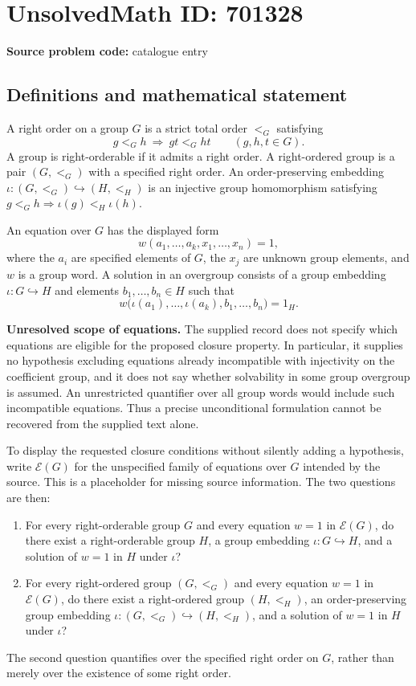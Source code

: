 \documentclass[11pt]{article}
\begin{document}
\section*{UnsolvedMath ID: 701328}
\textbf{Source problem code:} catalogue entry
\subsection{Definitions and mathematical statement}
A right order on a group \(G\) is a strict total order \(<_G\) satisfying
\[
 g<_G h\ \Longrightarrow\ gt<_G ht
 \qquad(g,h,t\in G).
\]
A group is right-orderable if it admits a right order. A right-ordered group is a pair \((G,<_G)\) with a specified right order. An order-preserving embedding \(\iota:(G,<_G)\hookrightarrow(H,<_H)\) is an injective group homomorphism satisfying \(g<_G h\Longrightarrow\iota(g)<_H\iota(h)\).

An equation over \(G\) has the displayed form
\[
 w(a_1,\ldots,a_k,x_1,\ldots,x_n)=1,
\]
where the \(a_i\) are specified elements of \(G\), the \(x_j\) are unknown group elements, and \(w\) is a group word. A solution in an overgroup consists of a group embedding \(\iota:G\hookrightarrow H\) and elements \(b_1,\ldots,b_n\in H\) such that
\[
 w\bigl(\iota(a_1),\ldots,\iota(a_k),b_1,\ldots,b_n\bigr)=1_H.
\]

\textbf{Unresolved scope of equations.} The supplied record does not specify which equations are eligible for the proposed closure property. In particular, it supplies no hypothesis excluding equations already incompatible with injectivity on the coefficient group, and it does not say whether solvability in some group overgroup is assumed. An unrestricted quantifier over all group words would include such incompatible equations. Thus a precise unconditional formulation cannot be recovered from the supplied text alone.

To display the requested closure conditions without silently adding a hypothesis, write \(\mathcal E(G)\) for the unspecified family of equations over \(G\) intended by the source. This is a placeholder for missing source information. The two questions are then:
\begin{enumerate}
\item For every right-orderable group \(G\) and every equation \(w=1\) in \(\mathcal E(G)\), do there exist a right-orderable group \(H\), a group embedding \(\iota:G\hookrightarrow H\), and a solution of \(w=1\) in \(H\) under \(\iota\)?
\item For every right-ordered group \((G,<_G)\) and every equation \(w=1\) in \(\mathcal E(G)\), do there exist a right-ordered group \((H,<_H)\), an order-preserving group embedding \(\iota:(G,<_G)\hookrightarrow(H,<_H)\), and a solution of \(w=1\) in \(H\) under \(\iota\)?
\end{enumerate}
The second question quantifies over the specified right order on \(G\), rather than merely over the existence of some right order.
\end{document}
